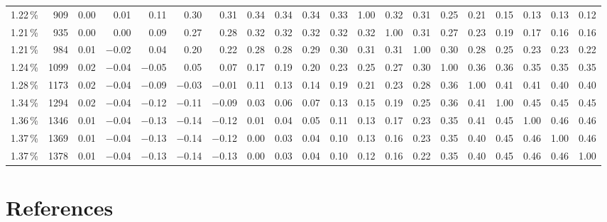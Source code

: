 \documentclass[12pt]{article}
\begin{document}
\begin{landscape}
\begin{table}[p]
\begin{tabular}{rr rrrrrrrrrrrrrrrrrr}
1.22\,\% & 909  & 0.00 & 0.01 & 0.11 & 0.30 & 0.31 & 0.34 & 0.34 & 0.34 & 0.33 & 1.00 & 0.32 & 0.31 & 0.25 & 0.21 & 0.15 & 0.13 & 0.13 & 0.12 \\
1.21\,\% & 935  & 0.00 & 0.00 & 0.09 & 0.27 & 0.28 & 0.32 & 0.32 & 0.32 & 0.32 & 0.32 & 1.00 & 0.31 & 0.27 & 0.23 & 0.19 & 0.17 & 0.16 & 0.16 \\
1.21\,\% & 984  & 0.01 & $-$0.02 & 0.04 & 0.20 & 0.22 & 0.28 & 0.28 & 0.29 & 0.30 & 0.31 & 0.31 & 1.00 & 0.30 & 0.28 & 0.25 & 0.23 & 0.23 & 0.22 \\
1.24\,\% & 1099 & 0.02 & $-$0.04 & $-$0.05 & 0.05 & 0.07 & 0.17 & 0.19 & 0.20 & 0.23 & 0.25 & 0.27 & 0.30 & 1.00 & 0.36 & 0.36 & 0.35 & 0.35 & 0.35 \\
1.28\,\% & 1173 & 0.02 & $-$0.04 & $-$0.09 & $-$0.03 & $-$0.01 & 0.11 & 0.13 & 0.14 & 0.19 & 0.21 & 0.23 & 0.28 & 0.36 & 1.00 & 0.41 & 0.41 & 0.40 & 0.40 \\
1.34\,\% & 1294 & 0.02 & $-$0.04 & $-$0.12 & $-$0.11 & $-$0.09 & 0.03 & 0.06 & 0.07 & 0.13 & 0.15 & 0.19 & 0.25 & 0.36 & 0.41 & 1.00 & 0.45 & 0.45 & 0.45 \\
1.36\,\% & 1346 & 0.01 & $-$0.04 & $-$0.13 & $-$0.14 & $-$0.12 & 0.01 & 0.04 & 0.05 & 0.11 & 0.13 & 0.17 & 0.23 & 0.35 & 0.41 & 0.45 & 1.00 & 0.46 & 0.46 \\
1.37\,\% & 1369 & 0.01 & $-$0.04 & $-$0.13 & $-$0.14 & $-$0.12 & 0.00 & 0.03 & 0.04 & 0.10 & 0.13 & 0.16 & 0.23 & 0.35 & 0.40 & 0.45 & 0.46 & 1.00 & 0.46 \\
1.37\,\% & 1378 & 0.01 & $-$0.04 & $-$0.13 & $-$0.14 & $-$0.13 & 0.00 & 0.03 & 0.04 & 0.10 & 0.12 & 0.16 & 0.22 & 0.35 & 0.40 & 0.45 & 0.46 & 0.46 & 1.00 \\
\bottomrule
\end{tabular}
\end{table}
\end{landscape}

\section*{References}
\end{document}
